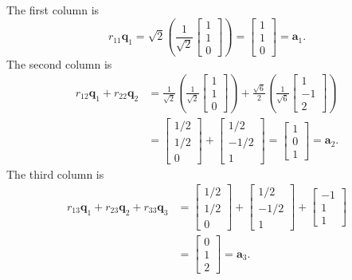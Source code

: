 The first column is
\[
    r_{11}\mathbf{q}_1
    =\sqrt{2}\left(\frac{1}{\sqrt{2}}
    \begin{bmatrix}
        1\\1\\0
    \end{bmatrix}\right)
    =
    \begin{bmatrix}
        1\\1\\0
    \end{bmatrix}
    =\mathbf{a}_1.
\]
The second column is
\[
\begin{aligned}
    r_{12}\mathbf{q}_1+r_{22}\mathbf{q}_2
    &=
    \frac{1}{\sqrt{2}}\left(\frac{1}{\sqrt{2}}
    \begin{bmatrix}
        1\\1\\0
    \end{bmatrix}\right)
    +
    \frac{\sqrt{6}}{2}\left(\frac{1}{\sqrt{6}}
    \begin{bmatrix}
        1\\-1\\2
    \end{bmatrix}\right)\\
    &=
    \begin{bmatrix}
        1/2\\1/2\\0
    \end{bmatrix}
    +
    \begin{bmatrix}
        1/2\\-1/2\\1
    \end{bmatrix}
    =
    \begin{bmatrix}
        1\\0\\1
    \end{bmatrix}
    =\mathbf{a}_2.
\end{aligned}
\]
The third column is
\[
\begin{aligned}
    r_{13}\mathbf{q}_1+r_{23}\mathbf{q}_2+r_{33}\mathbf{q}_3
    &=
    \begin{bmatrix}
        1/2\\1/2\\0
    \end{bmatrix}
    +
    \begin{bmatrix}
        1/2\\-1/2\\1
    \end{bmatrix}
    +
    \begin{bmatrix}
        -1\\1\\1
    \end{bmatrix}\\
    &=
    \begin{bmatrix}
        0\\1\\2
    \end{bmatrix}
    =\mathbf{a}_3.
\end{aligned}
\]
